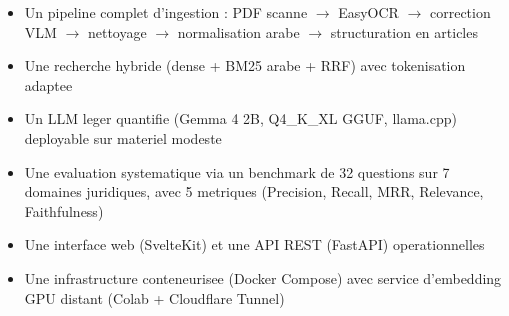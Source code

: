 \begin{itemize}
    \item Un pipeline complet d'ingestion : PDF scanne $\to$ EasyOCR $\to$ correction VLM $\to$ nettoyage $\to$ normalisation arabe $\to$ structuration en articles
    \item Une recherche hybride (dense + BM25 arabe + RRF) avec tokenisation adaptee
    \item Un LLM leger quantifie (Gemma 4 2B, Q4\_K\_XL GGUF, llama.cpp) deployable sur materiel modeste
    \item Une evaluation systematique via un benchmark de 32 questions sur 7 domaines juridiques, avec 5 metriques (Precision, Recall, MRR, Relevance, Faithfulness)
    \item Une interface web (SvelteKit) et une API REST (FastAPI) operationnelles
    \item Une infrastructure conteneurisee (Docker Compose) avec service d'embedding GPU distant (Colab + Cloudflare Tunnel)
\end{itemize}